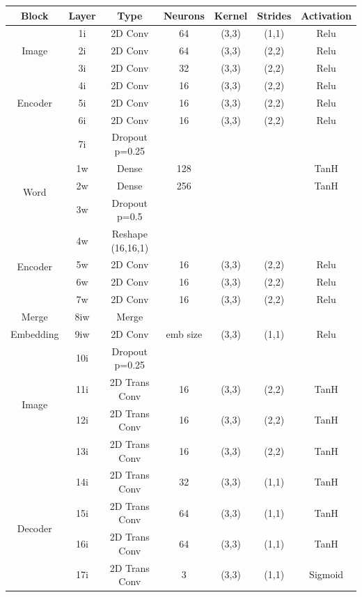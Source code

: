 \begin{table}
		\centering
		\begin{tabular}{|c|c|c|c|c|c|c|}
			\hline
			\textbf{Block} & \textbf{Layer} & \textbf{Type} & \textbf{Neurons} & \textbf{Kernel} & \textbf{Strides} & \textbf{Activation} \\ \hline
			\multirow{3}{*}{Image} & 1i	&	2D Conv & 64 & (3,3) & (1,1) & Relu \\ \cline{2-7}
			& 2i	&	2D Conv & 64 & (3,3) & (2,2) & Relu \\ \cline{2-7}
			& 3i	&	2D Conv & 32 & (3,3) & (2,2) & Relu \\ \cline{2-7}
\multirow{3}{*}{Encoder} & 4i	&	2D Conv & 16 & (3,3) & (2,2) & Relu \\ \cline{2-7}
			& 5i	&	2D Conv & 16 & (3,3) & (2,2) & Relu \\ \cline{2-7}
			& 6i	&	2D Conv & 16 & (3,3) & (2,2) & Relu \\ \cline{2-7}
			& 7i	&	Dropout p=0.25 &	 & 	     &       &  \\ \hline

			\multirow{3}{*}{Word} & 1w	& Dense & 128 & & &TanH \\ \cline{2-7}
			& 2w	& Dense & 256 & & &TanH \\ \cline{2-7}
			& 3w 	&	Dropout p=0.5 &	 & 	     &       & \\ \cline{2-7}
\multirow{4}{*}{Encoder}& 4w  &	Reshape (16,16,1) & & & & \\ \cline{2-7}
			& 5w	&	2D Conv & 16 & (3,3) & (2,2) & Relu \\ \cline{2-7}
			& 6w	&	2D Conv & 16 & (3,3) & (2,2) & Relu \\ \cline{2-7}
			& 7w	&	2D Conv & 16 & (3,3) & (2,2) & Relu \\ \hline

			Merge & 8iw	& Merge & & & & \\ \hline
Embedding & 9iw	&	2D Conv  & emb size & (3,3) & (1,1) & Relu \\ \hline
			
			
			\multirow{4}{*}{Image} & 10i 	&	Dropout p=0.25 &	 & 	     &       & \\ \cline{2-7}
			& 11i	&	2D Trans Conv & 16 & (3,3) & (2,2)  & TanH \\ \cline{2-7}
			& 12i	&	2D Trans Conv & 16 & (3,3) & (2,2)  & TanH \\ \cline{2-7}
			& 13i	&	2D Trans Conv & 16 & (3,3) & (2,2)  & TanH \\ \cline{2-7}
\multirow{4}{*}{Decoder}& 14i	&	2D Trans Conv & 32 & (3,3) & (1,1)  & TanH \\ \cline{2-7}
			& 15i	&	2D Trans Conv & 64 & (3,3) & (1,1)  & TanH \\ \cline{2-7}
			& 16i	&	2D Trans Conv & 64 & (3,3) & (1,1)  & TanH \\ \cline{2-7}
			& 17i	&	2D Trans Conv & 3 & (3,3) & (1,1) & Sigmoid\\ \hline 


\end{tabular}
\end{table}
